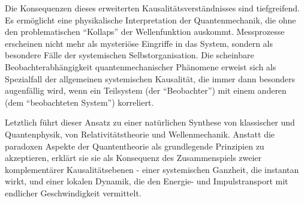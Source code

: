 Die Konsequenzen dieses erweiterten Kausalitätsverständnisses sind tiefgreifend. Es ermöglicht eine physikalische Interpretation der Quantenmechanik, die ohne den problematischen
\enquote{Kollaps} der Wellenfunktion auskommt. Messprozesse erscheinen nicht mehr als mysteriöse Eingriffe in das System, sondern als besondere Fälle der systemischen Selbstorganisation.
Die scheinbare Beobachterabhängigkeit quantenmechanischer Phänomene erweist sich als Spezialfall der allgemeinen systemischen Kausalität, die immer dann besonders augenfällig wird, wenn
ein Teilsystem (der \enquote{Beobachter}) mit einem anderen (dem \enquote{beobachteten System}) korreliert.

Letztlich führt dieser Ansatz zu einer natürlichen Synthese von klassischer und Quantenphysik, von Relativitätstheorie und Wellenmechanik. Anstatt die paradoxen Aspekte der Quantentheorie
als grundlegende Prinzipien zu akzeptieren, erklärt sie sie als Konsequenz des Zusammenspiels zweier komplementärer Kausalitätsebenen - einer systemischen Ganzheit, die instantan wirkt,
und einer lokalen Dynamik, die den Energie- und Impulstransport mit endlicher Geschwindigkeit vermittelt.
